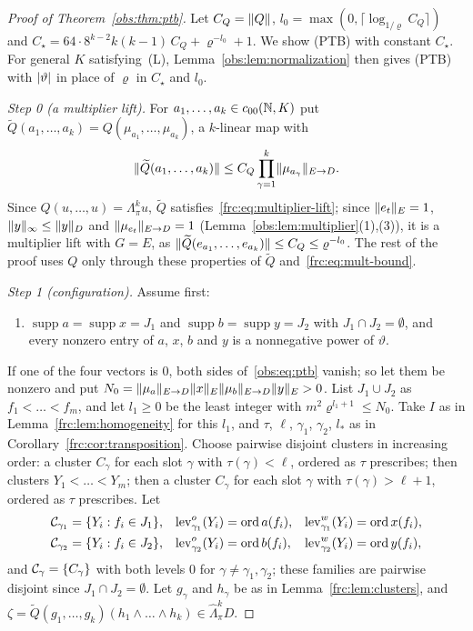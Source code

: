 \begin{proof}[Proof of Theorem~\ref{obs:thm:ptb}]
Let $C_Q=\lVert Q\rVert$, $l_0=\max(0,\lceil\log_{1/\varrho}C_Q\rceil)$ and $C_\star=64\cdot8^{k-2}k(k-1)\,C_Q+\varrho^{-l_0}+1$.
We show \textup{(PTB)} with constant $C_\star$. For general $K$ satisfying~\textup{(L)},
Lemma~\ref{obs:lem:normalization} then gives \textup{(PTB)} with $\lvert \vartheta\rvert$ in place of $\varrho$ in $C_\star$ and $l_0$.

\emph{Step 0 (a multiplier lift).} For $a_1,\dots,a_k\in c_{00}(\mathbb N,K)$ put
$\widetilde Q(a_1,\dots,a_k)=Q(\mu_{a_1},\dots,\mu_{a_k})$, a $k$\nobreakdash-linear map with
\begin{equation}\label{frc:eq:mult-bound}
 \lVert \widetilde Q(a_1,\dots,a_k)\rVert\le C_Q\prod_{\gamma=1}^k\lVert \mu_{a_\gamma}\rVert_{E\to D}.
\end{equation}
Since $Q(u,\dots,u)=\Lambda^k_\pi u$, $\widetilde Q$ satisfies~\eqref{frc:eq:multiplier-lift}; since $\lVert e_t\rVert_E=1$,
$\lVert y\rVert_\infty\le\lVert y\rVert_D$ and $\lVert \mu_{e_t}\rVert_{E\to D}=1$ (Lemma~\ref{obs:lem:multiplier}(1),(3)), it is a multiplier
lift with $G=E$, as $\lVert \widetilde Q(e_{a_1},\dots,e_{a_k})\rVert\le C_Q\le\varrho^{-l_0}$. The rest of the proof uses $Q$
only through these properties of $\widetilde Q$ and~\eqref{frc:eq:mult-bound}.

\emph{Step 1 (configuration).} Assume first:
\begin{enumerate}
\item[(A)] $\operatorname{supp}a=\operatorname{supp}x=J_1$ and $\operatorname{supp}b=\operatorname{supp}y=J_2$ with
$J_1\cap J_2=\emptyset$, and every nonzero entry of $a$, $x$, $b$ and $y$ is a nonnegative power of $\vartheta$.
\end{enumerate}
If one of the four vectors is $0$, both sides of~\eqref{obs:eq:ptb} vanish; so let them be nonzero and put
$N_0=\lVert \mu_a\rVert_{E\to D}\lVert x\rVert_E\lVert \mu_b\rVert_{E\to D}\lVert y\rVert_E>0$. List $J_1\cup J_2$ as $f_1<\dots<f_m$, and let
$l_1\ge0$ be the least integer with $m^2\varrho^{l_1+1}\le N_0$. Take $I$ as in Lemma~\ref{frc:lem:homogeneity} for this
$l_1$, and $\tau$, $\ell$, $\gamma_1$, $\gamma_2$, $l_*$ as in Corollary~\ref{frc:cor:transposition}. Choose pairwise
disjoint clusters in increasing order: a cluster $C_\gamma$ for each slot $\gamma$ with $\tau(\gamma)<\ell$, ordered as
$\tau$ prescribes; then clusters $Y_1<\dots<Y_m$; then a cluster $C_\gamma$ for each slot $\gamma$ with
$\tau(\gamma)>\ell+1$, ordered as $\tau$ prescribes. Let
\begin{align*}
 \mathcal{C}_{\gamma_1}&=\{Y_i:f_i\in J_1\},& \mathrm{lev}^o_{\gamma_1}(Y_i)&=\operatorname{ord} a(f_i),& \mathrm{lev}^w_{\gamma_1}(Y_i)&=\operatorname{ord} x(f_i),\\
 \mathcal{C}_{\gamma_2}&=\{Y_i:f_i\in J_2\},& \mathrm{lev}^o_{\gamma_2}(Y_i)&=\operatorname{ord} b(f_i),& \mathrm{lev}^w_{\gamma_2}(Y_i)&=\operatorname{ord} y(f_i),
\end{align*}
and $\mathcal{C}_\gamma=\{C_\gamma\}$ with both levels $0$ for $\gamma\ne\gamma_1,\gamma_2$; these families are pairwise disjoint
since $J_1\cap J_2=\emptyset$. Let $g_\gamma$ and $h_\gamma$ be as in Lemma~\ref{frc:lem:clusters}, and
$\zeta=\widetilde Q(g_1,\dots,g_k)(h_1\wedge\dots\wedge h_k)\in\widehat\Lambda^k_\pi D$.


\end{proof}
